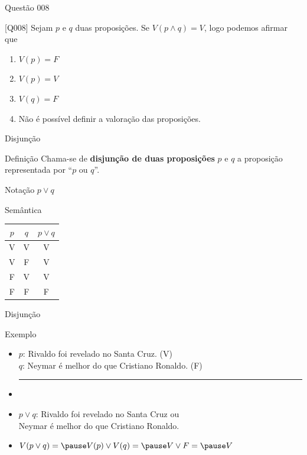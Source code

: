 \documentclass[xcolor=dvipsnames,table]{beamer}
\begin{document}
\begin{frame}{Questão 008}
\begin{block}{[Q008]}
	Sejam $p$ e $q$ duas proposições. Se $V(p \wedge q) = V$, logo podemos afirmar que
\end{block}
\begin{enumerate}[label=(\Alph*)]
	\item $V(p) = F$
	\item $V(p) = V$
	\item $V(q) = F$
	\item Não é possível definir a valoração das proposições.
\end{enumerate}
\end{frame}

\begin{frame}{Disjunção}
	\begin{block}{Definição}
		Chama-se de {\bf disjunção de duas proposições} $p$ e $q$ a proposição representada por ``$p$ ou $q$''.
	\end{block} \pause
	\begin{block}{Notação}
		$p \vee q$
	\end{block} \pause
	\begin{block}{Semântica}
		\begin{center}
			\begin{tabular}{|cc|c|}
				\hline
				$p$	&	$q$	&	$p \vee q$	\\
				\hline
				V	&	V	&	V	\\
				V	&	F	&	V	\\
				F	&	V	&	V	\\
				F	&	F	&	F	\\
				\hline
			\end{tabular}
		\end{center}
	\end{block}
\end{frame}

\begin{frame}{Disjunção}
\begin{block}{Exemplo}
\begin{itemize}
	\item $p$: Rivaldo foi revelado no Santa Cruz. \hspace*{0.9cm} (V)\\
	$q$: Neymar é melhor do que Cristiano Ronaldo. \hspace*{0.9cm} (F)\\
	\hrule
	\item \pause
	\item $p \vee q$: Rivaldo foi revelado no Santa Cruz ou \\Neymar é melhor do que Cristiano Ronaldo.\\ \pause
	\item $V(p \vee q) = \pause V(p) \vee V(q) = \pause V \vee F = \pause V$
\end{itemize}
\end{block}
\end{frame}
\end{document}
